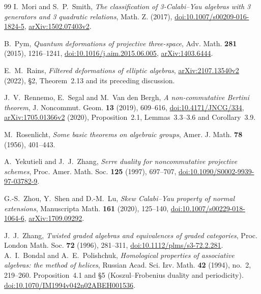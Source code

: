\documentclass[11pt,a4paper]{ltjsarticle}
\numberwithin{equation}{section}
\begin{document}
\begin{thebibliography}{99}
I.~Mori and S.~P.~Smith,
\textit{The classification of 3-Calabi--Yau algebras with 3 generators and 3 quadratic relations},
Math. Z. (2017),
\href{https://doi.org/10.1007/s00209-016-1824-5}{doi:10.1007/s00209-016-1824-5},
\href{https://arxiv.org/abs/1502.07403}{arXiv:1502.07403v2}.

B.~Pym,
\textit{Quantum deformations of projective three-space},
Adv. Math. \textbf{281} (2015), 1216--1241,
\href{https://doi.org/10.1016/j.aim.2015.06.005}{doi:10.1016/j.aim.2015.06.005},
\href{https://arxiv.org/abs/1403.6444}{arXiv:1403.6444}.

E.~M.~Rains,
\textit{Filtered deformations of elliptic algebras},
\href{https://arxiv.org/abs/2107.13540v2}{arXiv:2107.13540v2} (2022),
\S2, Theorem~2.13 and its preceding discussion.

J.~V.~Rennemo, E.~Segal and M.~Van den Bergh,
\textit{A non-commutative Bertini theorem},
J. Noncommut. Geom. \textbf{13} (2019), 609--616,
\href{https://doi.org/10.4171/JNCG/334}{doi:10.4171/JNCG/334},
\href{https://arxiv.org/abs/1705.01366v2}{arXiv:1705.01366v2} (2020),
Proposition~2.1, Lemmas~3.3--3.6 and Corollary~3.9.

M.~Rosenlicht,
\textit{Some basic theorems on algebraic groups},
Amer. J. Math. \textbf{78} (1956), 401--443.

A.~Yekutieli and J.~J.~Zhang,
\textit{Serre duality for noncommutative projective schemes},
Proc. Amer. Math. Soc. \textbf{125} (1997), 697--707,
\href{https://doi.org/10.1090/S0002-9939-97-03782-9}{doi:10.1090/S0002-9939-97-03782-9}.

G.-S.~Zhou, Y.~Shen and D.-M.~Lu,
\textit{Skew Calabi--Yau property of normal extensions},
Manuscripta Math. \textbf{161} (2020), 125--140,
\href{https://doi.org/10.1007/s00229-018-1064-6}{doi:10.1007/s00229-018-1064-6},
\href{https://arxiv.org/abs/1709.09292}{arXiv:1709.09292}.

J.~J.~Zhang,
\textit{Twisted graded algebras and equivalences of graded categories},
Proc. London Math. Soc. \textbf{72} (1996), 281--311,
\href{https://doi.org/10.1112/plms/s3-72.2.281}{doi:10.1112/plms/s3-72.2.281}.
A.~I.~Bondal and A.~E.~Polishchuk,
\emph{Homological properties of associative algebras: the method of helices},
Russian Acad. Sci. Izv. Math. \textbf{42} (1994), no.~2, 219--260.
Proposition~4.1 and \S5 (Koszul--Frobenius duality and periodicity).
\href{https://doi.org/10.1070/IM1994v042n02ABEH001536}
{doi:10.1070/IM1994v042n02ABEH001536}.


\end{thebibliography}
\end{document}
